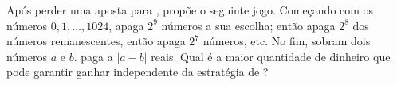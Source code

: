 Após perder uma aposta para ,  propõe o seguinte jogo. Começando com os números $0, 1, \dots, 1024$,  apaga $2^9$ números a sua escolha; então  apaga $2^8$ dos números remanescentes, então  apaga $2^7$ números, etc. No fim, sobram dois números $a$ e $b$.  paga a  $|a-b|$ reais. Qual é a maior quantidade de dinheiro que  pode garantir ganhar independente da estratégia de ?
